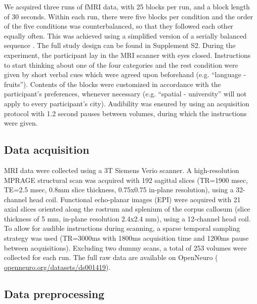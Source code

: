 \documentclass[fleqn,10pt]{SelfArx} %
\begin{document}
We acquired three runs of fMRI data, with 25 blocks per run, and a block length of 30 seconds. Within each run, there were five blocks per condition and the order of the five conditions was counterbalanced, so that they followed each other equally often. This was achieved using a simplified version of a serially balanced sequence \citep{Nair_1967}. The full study design can be found in Supplement S2. 
During the experiment, the participant lay in the MRI scanner with eyes closed. Instructions to start thinking about one of the four categories and the rest condition were given by short verbal cues which were agreed upon beforehand (e.g. “language - fruits”). Contents of the blocks were customized in accordance with the participant's preferences, whenever necessary (e.g. “spatial - university” will not apply to every participant's city). Audibility was ensured by using an acquisition protocol with 1.2 second pauses between volumes, during which the instructions were given.

\subsection{Data acquisition}

MRI data were collected using a 3T Siemens Verio scanner. A high-resolution MPRAGE structural scan was acquired with 192 sagittal slices (TR=1900 msec, TE=2.5 msec, 0.8mm slice thickness, 0.75x0.75 in-plane resolution), using a 32-channel head coil. Functional echo-planar images (EPI) were acquired with 21 axial slices oriented along the rostrum and splenium of the corpus callosum (slice thickness of 5 mm, in-plane resolution 2.4x2.4 mm), using a 12-channel head coil. To allow for audible instructions during scanning, a sparse temporal sampling strategy was used (TR=3000ms with 1800ms acquisition time and 1200ms pause between acquisitions). Excluding two dummy scans, a total of 253 volumes were collected for each run. The full raw data are available on OpenNeuro ( \href{https://openneuro.org/datasets/ds001419}{openneuro.org/datasets/ds001419}).

\subsection{Data preprocessing}
\end{document}
